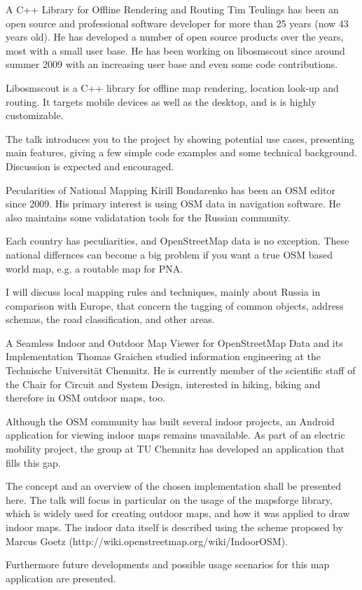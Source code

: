%
{A C++ Library for Offline Rendering and Routing}%
{Tim Teulings has been an open source and professional software developer for more than 25 years (now 43 years old). He has developed a number of open source products over the years, most with a small user base. He has been working on libosmscout since around summer 2009 with an increasing user base and even some code contributions.}%
{Libosmscout is a C++ library for offline map rendering, location look-up and routing. It targets mobile devices as well as the desktop, and is is highly customizable.

The talk introduces you to the project by showing potential use cases, presenting main features, giving a few simple code examples and some technical background. Discussion is expected and encouraged.}


%
{Pecularities of National Mapping}%
{Kirill Bondarenko has been an OSM editor since 2009. His primary interest is using OSM data in navigation software. He also maintains some validatation tools for the Russian community.}%
{Each country has peculiarities, and OpenStreetMap data is no exception. These national differnces can become a big problem  if you want a true OSM based world map, e.g. a routable map for PNA.

I will discuss local mapping rules and techniques, mainly about Russia in comparison with Europe, that concern the tagging of common objects, address schemas, the road classification, and other areas.}


%
{A Seamless Indoor and Outdoor Map Viewer for OpenStreetMap Data and its Implementation}%
{Thomas Graichen studied information engineering at the Technische Universität Chemnitz. He is currently member of the scientific staff of the Chair for Circuit and System Design, interested in hiking, biking and therefore in OSM outdoor maps, too.}%
{Although the OSM community has built several indoor projects, an Android application for viewing indoor maps remains unavailable. As part of an electric mobility project, the group at TU Chemnitz has developed an application that fills this gap.

The concept and an overview of the chosen implementation shall be presented here. The talk will focus in particular on the usage of the mapsforge library, which is widely used for creating outdoor maps, and how it was applied to draw indoor maps. The indoor data itself is described using the scheme proposed by Marcus Goetz (http://wiki.openstreetmap.org/wiki/IndoorOSM).

Furthermore future developments and possible usage scenarios for this map application are presented.}

